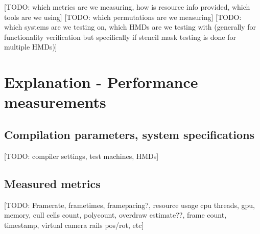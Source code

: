 [TODO: which metrics are we measuring, how is resource info provided, which tools are we using] 
[TODO: which permutations are we measuring] 
[TODO: which systems are we testing on, which HMDs are we testing with (generally for functionality verification but specifically if stencil mask testing is done for multiple HMDs)] 
\section{Explanation - Performance measurements}
\subsection{Compilation parameters, system specifications}
[TODO: compiler settings, test machines, HMDs]
\subsection{Measured metrics}
[TODO: Framerate, frametimes, framepacing?, resource usage cpu threads, gpu, memory, cull cells count, polycount, overdraw estimate??, frame count, timestamp, virtual camera rails pos/rot, etc]